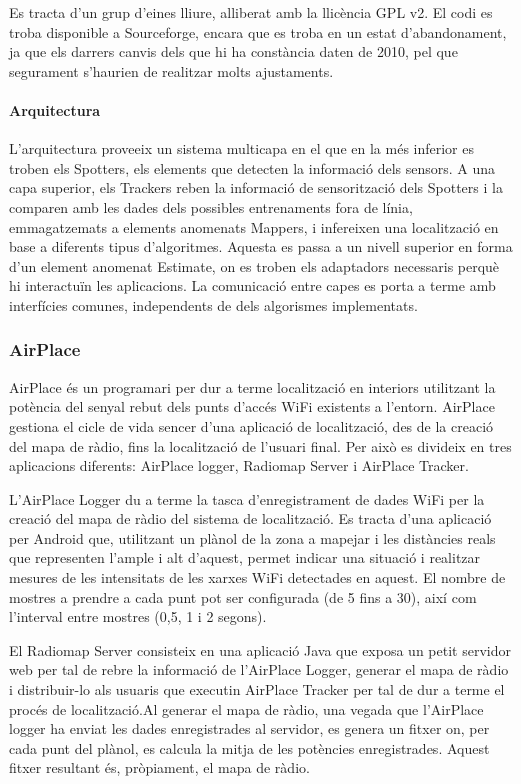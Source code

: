 Es tracta d’un grup d’eines lliure, alliberat amb la llicència GPL v2. El codi es troba disponible a Sourceforge, encara que es troba en un estat d’abandonament, ja que els darrers canvis dels que hi ha constància daten de 2010, pel que segurament s’haurien de realitzar molts ajustaments.

\paragraph{Arquitectura}

L'arquitectura proveeix un sistema multicapa en el que en la més inferior es troben els Spotters, els elements que detecten la informació dels sensors. A una capa superior, els Trackers reben la informació de sensorització dels Spotters i la comparen amb les dades dels possibles entrenaments fora de línia, emmagatzemats a elements anomenats Mappers, i infereixen una localització en base a diferents tipus d’algoritmes. Aquesta es passa a un nivell superior en forma d'un element anomenat Estimate, on es troben els adaptadors necessaris perquè hi interactuïn les aplicacions. La comunicació entre capes es porta a terme amb interfícies comunes, independents de dels algorismes implementats.

\subsubsection{AirPlace}

AirPlace \cite{laoudias} és un programari per dur a terme localització en interiors utilitzant la potència del senyal rebut dels punts d'accés WiFi existents a l'entorn. AirPlace gestiona el cicle de vida sencer d'una aplicació de localització, des de la creació del mapa de ràdio, fins la localització de l'usuari final. Per això es divideix en tres aplicacions diferents: AirPlace logger, Radiomap Server i AirPlace Tracker.

L'AirPlace Logger du a terme la tasca d'enregistrament de dades WiFi per la creació del mapa de ràdio del sistema de localització. Es tracta d'una aplicació per Android que, utilitzant un plànol de la zona a mapejar i les distàncies reals que representen l'ample i alt d'aquest, permet indicar una situació i realitzar mesures de les intensitats de les xarxes WiFi detectades en aquest. El nombre de mostres a prendre a cada punt pot ser configurada (de 5 fins a 30), així com l'interval entre mostres (0,5, 1 i 2 segons).

El Radiomap Server consisteix en una aplicació Java que exposa un petit servidor web per tal de rebre la informació de l'AirPlace Logger, generar el mapa de ràdio i distribuir-lo als usuaris que executin AirPlace Tracker per tal de dur a terme el procés de localització.Al generar el mapa de ràdio, una vegada que l'AirPlace logger ha enviat les dades enregistrades al servidor, es genera un fitxer on, per cada punt del plànol, es calcula la mitja de les potències enregistrades. Aquest fitxer resultant és, pròpiament, el mapa de ràdio.

